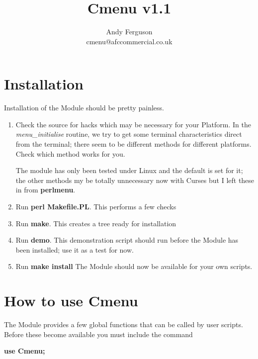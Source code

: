 \documentclass[a4paper]{scrartcl}
\title{Cmenu v1.1}
\author{Andy Ferguson\\cmenu@afccommercial.co.uk}
\begin{document}
\maketitle
{}

\tableofcontents

\section{Installation}
Installation of the Module should be pretty painless.
\begin{enumerate}
\item Check the source for hacks which may be necessary for your Platform. In the \textit{menu\_initialise} routine, we try to get some terminal characteristics direct from the terminal; there seem to be different methods for different platforms. Check which method works for you.

The module has only been tested under Linux and the default is set for it; the other methods my be totally unnecessary now with Curses but I left these in from \textbf{perlmenu}.
\item Run \textbf{perl Makefile.PL}. This performs a few checks
\item Run \textbf{make}. This creates a tree ready for installation
\item Run \textbf{demo}. This demonstration script should run before the Module has been installed; use it as a test for now.
\item Run \textbf{make install} The Module should now be available for your own scripts.
\end{enumerate}

\section{How to use Cmenu}
The Module provides a few global functions that can be called by user scripts. Before these become available you must include the command

\textbf{use Cmenu;}
\end{document}
